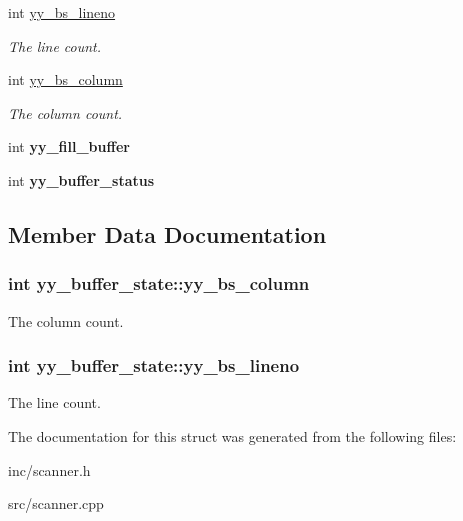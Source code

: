 \begin{DoxyCompactItemize}
\item 
int \hyperlink{structyy__buffer__state_a818e94bc9c766e683c60df1e9fd01199}{yy\+\_\+bs\+\_\+lineno}
\begin{DoxyCompactList}\small\item\em The line count. \end{DoxyCompactList}\item 
int \hyperlink{structyy__buffer__state_a10c4fcd8be759e6bf11e6d3e8cdb0307}{yy\+\_\+bs\+\_\+column}
\begin{DoxyCompactList}\small\item\em The column count. \end{DoxyCompactList}\item 
\hypertarget{structyy__buffer__state_a63d2afbb1d79a3fc63df9e12626f827d}{}int {\bfseries yy\+\_\+fill\+\_\+buffer}\label{structyy__buffer__state_a63d2afbb1d79a3fc63df9e12626f827d}

\item 
\hypertarget{structyy__buffer__state_a70fd925d37a2f0454fbd0def675d106c}{}int {\bfseries yy\+\_\+buffer\+\_\+status}\label{structyy__buffer__state_a70fd925d37a2f0454fbd0def675d106c}

\end{DoxyCompactItemize}


\subsection{Member Data Documentation}
\hypertarget{structyy__buffer__state_a10c4fcd8be759e6bf11e6d3e8cdb0307}{}
\subsubsection[{yy\+\_\+bs\+\_\+column}]{\setlength{\rightskip}{0pt plus 5cm}int yy\+\_\+buffer\+\_\+state\+::yy\+\_\+bs\+\_\+column}\label{structyy__buffer__state_a10c4fcd8be759e6bf11e6d3e8cdb0307}


The column count. 

\hypertarget{structyy__buffer__state_a818e94bc9c766e683c60df1e9fd01199}{}
\subsubsection[{yy\+\_\+bs\+\_\+lineno}]{\setlength{\rightskip}{0pt plus 5cm}int yy\+\_\+buffer\+\_\+state\+::yy\+\_\+bs\+\_\+lineno}\label{structyy__buffer__state_a818e94bc9c766e683c60df1e9fd01199}


The line count. 



The documentation for this struct was generated from the following files\+:\begin{DoxyCompactItemize}
\item 
inc/scanner.\+h\item 
src/scanner.\+cpp\end{DoxyCompactItemize}

